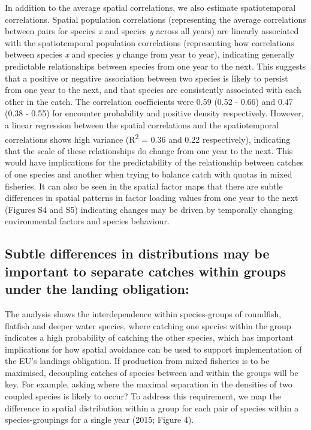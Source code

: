 \documentclass[fleqn,10pt]{wlscirep}
\begin{document}
\begin{linenumbers}
In addition to the average spatial correlations, we also estimate
spatiotemporal correlations. Spatial population correlations (representing the
average correlations between pairs for species \textit{x} and species
\textit{y} across all years) are linearly associated with the spatiotemporal
population correlations (representing how correlations between species
\textit{x} and species \textit{y} change from year to year), indicating
generally predictable relationships between species from one year to the next.
This suggests that a positive or negative association between two species is
likely to persist from one year to the next, and that species are consistently
associated with each other in the catch. The correlation coefficients were 0.59
(0.52 - 0.66) and 0.47 (0.38 - 0.55) for encounter probability and positive
density respectively.  However, a linear regression between the spatial
correlations and the spatiotemporal correlations shows high variance
(R\textsuperscript{2} = 0.36 and 0.22 respectively), indicating that the scale
of these relationships do change from one year to the next.
This would have implications for the predictability of the relationship between
catches of one species and another when trying to balance catch with quotas in
mixed fisheries. It can also be seen in the spatial factor maps that there are
subtle differences in spatial patterns in factor loading values from one year
to the next (Figures S4 and S5) indicating changes may be driven by temporally
changing environmental factors and species behaviour.\\


\subsection*{Subtle differences in distributions may be important to separate
	catches within groups under the landing obligation:\\} The analysis shows
the interdependence within species-groups of roundfish, flatfish and deeper
water species, where catching one species within the group indicates a high
probability of catching the other species, which has important implications for
how spatial avoidance can be used to support implementation of the EU's
landings obligation. If production from mixed fisheries is to be maximised,
decoupling catches of species between and within the groups will be key. For
example, asking where the maximal separation in the densities of two coupled
species is likely to occur? To address this requirement, we map the difference
in spatial distribution within a group for each pair of species within a
species-groupings for a single year (2015; Figure 4). \\


\end{linenumbers}
\end{document}

